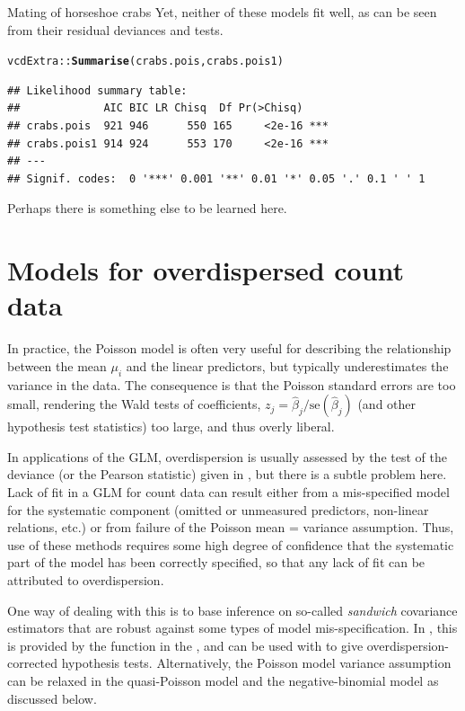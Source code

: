 \documentclass[11pt]{book}\usepackage[]{graphicx}\usepackage[]{color}
\makeatletter
\newcommand{\hlstd}[1]{\textcolor[rgb]{0.345,0.345,0.345}{#1}}%
\newcommand{\hlkwd}[1]{\textcolor[rgb]{0.737,0.353,0.396}{\textbf{#1}}}%
\newenvironment{kframe}{%
 \def\at@end@of@kframe{}%
 \ifinner\ifhmode%
  \def\at@end@of@kframe{\end{minipage}}%
  \begin{minipage}{\columnwidth}%
 \fi\fi%
 \def\FrameCommand##1{\hskip\@totalleftmargin \hskip-\fboxsep
 \colorbox{shadecolor}{##1}\hskip-\fboxsep
     \hskip-\linewidth \hskip-\@totalleftmargin \hskip\columnwidth}%
 \MakeFramed {\advance\hsize-\width
   \@totalleftmargin\z@ \linewidth\hsize
   \@setminipage}}%
 {\par\unskip\endMakeFramed%
 \at@end@of@kframe}
\newenvironment{knitrout}{}{} %
\renewenvironment{knitrout}{\small\renewcommand{\baselinestretch}{.85}}{} %
\makeatother
\begin{document}
\begin{Example}[crabs1]{Mating of horseshoe crabs}
Yet, neither of these models fit well, as can be seen from their residual deviances
and \LR tests.
\begin{knitrout}
\color{fgcolor}\begin{kframe}
\begin{alltt}
\hlstd{vcdExtra::}\hlkwd{Summarise}\hlstd{(crabs.pois, crabs.pois1)}
\end{alltt}
\begin{verbatim}
## Likelihood summary table:
##             AIC BIC LR Chisq  Df Pr(>Chisq)    
## crabs.pois  921 946      550 165     <2e-16 ***
## crabs.pois1 914 924      553 170     <2e-16 ***
## ---
## Signif. codes:  0 '***' 0.001 '**' 0.01 '*' 0.05 '.' 0.1 ' ' 1
\end{verbatim}
\end{kframe}
\end{knitrout}
Perhaps there is something else to be learned here.

\end{Example} 

\section{Models for overdispersed count data}\label{sec:glm-overdisp}

In practice, the Poisson model is often very useful for describing the
relationship between the mean $\mu_i$ and the linear predictors,
but typically underestimates the variance in the data.
The consequence is that the Poisson standard errors are too small,
rendering the Wald tests of coefficients, $z_j = \widehat{\beta}_j / \mathrm{se} (\widehat{\beta}_j) $
(and other hypothesis test statistics)
too large, and thus overly liberal.

In applications of the GLM, overdispersion is usually assessed by the \LR
test of the deviance (or the Pearson statistic) given in ,
but there is a subtle problem here. Lack of fit in a GLM for count data can result
either from a mis-specified model for the systematic component
(omitted or unmeasured predictors, non-linear relations, etc.)
or from failure of the Poisson mean = variance assumption.
Thus, use of these methods requires some high degree of confidence that the
systematic part of the model has been correctly specified, so that any
lack of fit can be attributed to overdispersion.

One way of dealing with this is to base inference on
so-called \emph{sandwich} covariance estimators that are robust against
some types of model mis-specification.  In \R, this is provided by the
 function in the , and can be used
with  to give overdispersion-corrected
hypothesis tests.
Alternatively, the Poisson model variance assumption can be relaxed
in the quasi-Poisson model and the negative-binomial model as
discussed below.
\end{document}
